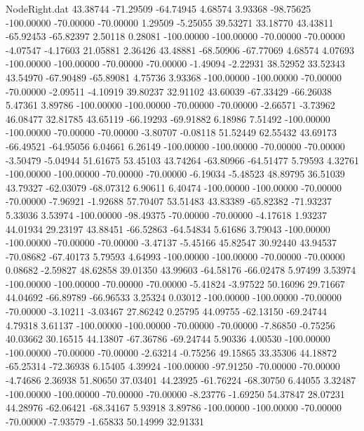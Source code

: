 \begin{filecontents}{NodeRight.dat}
  43.38744  -71.29509  -64.74945     4.68574    3.93368  -98.75625 -100.00000  -70.00000  -70.00000    1.29509   -5.25055   39.53271   33.18770
  43.43811  -65.92453  -65.82397     2.50118    0.28081 -100.00000 -100.00000  -70.00000  -70.00000   -4.07547   -4.17603   21.05881    2.36426
  43.48881  -68.50906  -67.77069     4.68574    4.07693 -100.00000 -100.00000  -70.00000  -70.00000   -1.49094   -2.22931   38.52952   33.52343
  43.54970  -67.90489  -65.89081     4.75736    3.93368 -100.00000 -100.00000  -70.00000  -70.00000   -2.09511   -4.10919   39.80237   32.91102
  43.60039  -67.33429  -66.26038     5.47361    3.89786 -100.00000 -100.00000  -70.00000  -70.00000   -2.66571   -3.73962   46.08477   32.81785
  43.65119  -66.19293  -69.91882     6.18986    7.51492 -100.00000 -100.00000  -70.00000  -70.00000   -3.80707   -0.08118   51.52449   62.55432
  43.69173  -66.49521  -64.95056     6.04661    6.26149 -100.00000 -100.00000  -70.00000  -70.00000   -3.50479   -5.04944   51.61675   53.45103
  43.74264  -63.80966  -64.51477     5.79593    4.32761 -100.00000 -100.00000  -70.00000  -70.00000   -6.19034   -5.48523   48.89795   36.51039
  43.79327  -62.03079  -68.07312     6.90611    6.40474 -100.00000 -100.00000  -70.00000  -70.00000   -7.96921   -1.92688   57.70407   53.51483
  43.83389  -65.82382  -71.93237     5.33036    3.53974 -100.00000  -98.49375  -70.00000  -70.00000   -4.17618    1.93237   44.01934   29.23197
  43.88451  -66.52863  -64.54834     5.61686    3.79043 -100.00000 -100.00000  -70.00000  -70.00000   -3.47137   -5.45166   45.82547   30.92440
  43.94537  -70.08682  -67.40173     5.79593    4.64993 -100.00000 -100.00000  -70.00000  -70.00000    0.08682   -2.59827   48.62858   39.01350
  43.99603  -64.58176  -66.02478     5.97499    3.53974 -100.00000 -100.00000  -70.00000  -70.00000   -5.41824   -3.97522   50.16096   29.71667
  44.04692  -66.89789  -66.96533     3.25324    0.03012 -100.00000 -100.00000  -70.00000  -70.00000   -3.10211   -3.03467   27.86242    0.25795
  44.09755  -62.13150  -69.24744     4.79318    3.61137 -100.00000 -100.00000  -70.00000  -70.00000   -7.86850   -0.75256   40.03662   30.16515
  44.13807  -67.36786  -69.24744     5.90336    4.00530 -100.00000 -100.00000  -70.00000  -70.00000   -2.63214   -0.75256   49.15865   33.35306
  44.18872  -65.25314  -72.36938     6.15405    4.39924 -100.00000  -97.91250  -70.00000  -70.00000   -4.74686    2.36938   51.80650   37.03401
  44.23925  -61.76224  -68.30750     6.44055    3.32487 -100.00000 -100.00000  -70.00000  -70.00000   -8.23776   -1.69250   54.37847   28.07231
  44.28976  -62.06421  -68.34167     5.93918    3.89786 -100.00000 -100.00000  -70.00000  -70.00000   -7.93579   -1.65833   50.14999   32.91331

\end{filecontents}
